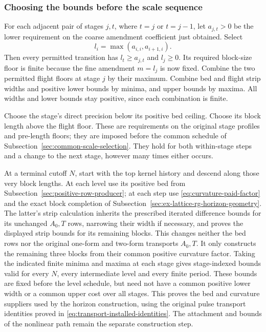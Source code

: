 \subsubsection{Choosing the bounds before the scale sequence}
For each adjacent pair of stages $j,t$, where $t=j$ or $t=j-1$,
let $a_{j,t}>0$ be the lower requirement on the coarse amendment
coefficient just obtained. Select
\[
                         l_i=\max(a_{i,i},a_{i+1,i}).
\]
Then every permitted transition has $l_t\ge a_{j,t}$ and
$l_j\ge0$. Its required block-size floor is finite because the
fine amendment $m=l_j$ is now fixed. Combine the two permitted
flight floors at stage $j$ by their maximum. Combine bed and
flight strip widths and positive lower bounds by minima, and
upper bounds by maxima. All widths and lower bounds stay positive,
since each combination is finite.

Choose the stage's direct precision below its positive bed
ceiling. Choose its block length above the flight floor. These
are requirements on the original stage profiles and pre-length
floors; they are imposed before the common schedule of
Subsection~\ref{sec:common-scale-selection}. They hold for both
within-stage steps and a change to the next stage, however many
times either occurs.

At a terminal cutoff $N$, start with the top kernel history and descend
along those very block lengths. At each level use its positive
bed from Subsection~\ref{sec:positive-row-producer}; at each step
use \eqref{eq:curvature-paid-factor} and the exact block completion
of Subsection~\ref{sec:ex-lattice-rg-horizon-geometry}. The latter's
strip calculation inherits the prescribed iterated difference bounds
for its unchanged $A_0,T$ rows, narrowing their width if necessary,
and proves the displayed strip bounds for its remaining blocks. This changes neither the bed rows nor the
original one-form and two-form transports $A_0,T$. It only
constructs the remaining three blocks from their common positive
curvature factor. Taking the indicated finite minima and maxima at each
stage gives stage-indexed bounds valid for every $N$, every intermediate
level and every finite period. These bounds are fixed before the level
schedule, but need not have a common positive lower width or a common
upper cost over all stages. This proves the bed
and curvature suppliers used by the horizon construction, using
the original pulse transport identities proved in
\eqref{eq:transport-installed-identities}. The attachment and bounds of the
nonlinear path remain the separate construction step.
